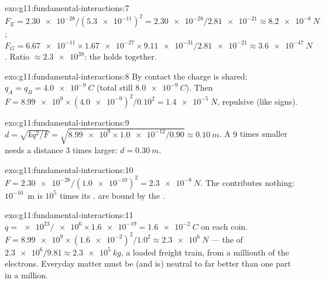 \begin{solution}{exo:g11:fundamental-interactions:7}
$F_E = \num{2.30e-28}/(\num{5.3e-11})^2 = \num{2.30e-28}/\num{2.81e-21}
\approx \qty{8.2e-8}{N}$;
$F_G = \num{6.67e-11} \times \num{1.67e-27} \times \num{9.11e-31} /
\num{2.81e-21} \approx \qty{3.6e-47}{N}$. Ratio $\approx \num{2.3e39}$:
the  holds  together.
\end{solution}

\begin{solution}{exo:g11:fundamental-interactions:8}
By contact the charge is shared: $q_A = q_B = \qty{+4.0e-9}{C}$ (total
still $\qty{8.0e-9}{C}$). Then
$F = \num{8.99e9} \times (\num{4.0e-9})^2/0.10^2 =
\qty{1.4e-5}{N}$, repulsive (like signs).
\end{solution}

\begin{solution}{exo:g11:fundamental-interactions:9}
$d = \sqrt{k q^2/F} = \sqrt{\num{8.99e9} \times \num{1.0e-12}/0.90}
\approx \qty{0.10}{m}$. A  $9$ times smaller needs a distance $3$
times larger: $d = \qty{0.30}{m}$.
\end{solution}

\begin{solution}{exo:g11:fundamental-interactions:10}
$F = \num{2.30e-28}/(\num{1.0e-10})^2 = \qty{2.3e-8}{N}$. The  contributes nothing: $10^{-10}$~m is $10^{5}$ times its
.  are bound by the .
\end{solution}

\begin{solution}{exo:g11:fundamental-interactions:11}
$q = \num{e23}/\num{e6} \times \num{1.6e-19} = \qty{1.6e-2}{C}$ on each
coin. $F = \num{8.99e9} \times (\num{1.6e-2})^2/1.0^2 \approx
\qty{2.3e6}{N}$ --- the  of $\num{2.3e6}/9.81 \approx
\qty{2.3e5}{kg}$, a loaded freight train, from a millionth of the
electrons. Everyday matter must be (and is) neutral to far better than
one part in a million.
\end{solution}

